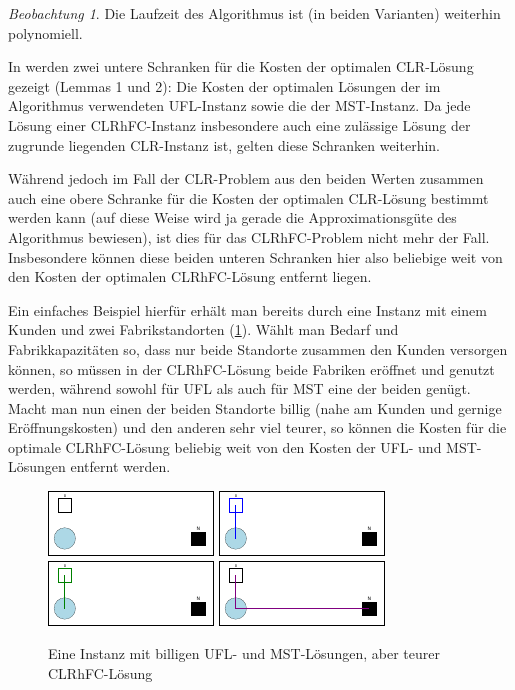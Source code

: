 \documentclass[a4paper,ngerman,11pt,bibtotoc]{scrartcl}
\theoremstyle{definition}
\theoremstyle{plain}
\theoremstyle{remark}
\newtheorem{beob}[defn]{Beobachtung}
\newcommand{\CLR}{CLR}
\newcommand{\CLRHFC}{CLRhFC}
\newcommand{\MST}{MST}
\newcommand{\UFL}{UFL}
\begin{document}
	\begin{beob}
		Die Laufzeit des Algorithmus ist (in beiden Varianten) weiterhin polynomiell. 
	\end{beob}
	
	In \cite{AAfCLR} werden zwei untere Schranken für die Kosten der optimalen \CLR-Lösung gezeigt (Lemmas 1 und 2): Die Kosten der optimalen Lösungen der im Algorithmus verwendeten \UFL-Instanz sowie die der \MST-Instanz. Da jede Lösung einer \CLRHFC-Instanz insbesondere auch eine zulässige Lösung der zugrunde liegenden \CLR-Instanz ist, gelten diese Schranken weiterhin.
	
	Während jedoch im Fall der \CLR-Problem aus den beiden Werten zusammen auch eine obere Schranke für die Kosten der optimalen \CLR-Lösung bestimmt werden kann (auf diese Weise wird ja gerade die Approximationsgüte des Algorithmus bewiesen), ist dies für das \CLRHFC-Problem nicht mehr der Fall. Insbesondere können diese beiden unteren Schranken hier also beliebige weit von den Kosten der optimalen \CLRHFC-Lösung entfernt liegen.
	
	Ein einfaches Beispiel hierfür erhält man bereits durch eine Instanz mit einem Kunden und zwei Fabrikstandorten (\cref{fig:bsp:schlechteUntereSchranken}). Wählt man Bedarf und Fabrikkapazitäten so, dass nur beide Standorte zusammen den Kunden versorgen können, so müssen in der \CLRHFC-Lösung beide Fabriken eröffnet und genutzt werden, während sowohl für \UFL{} als auch für \MST{} eine der beiden genügt. Macht man nun einen der beiden Standorte billig (nahe am Kunden und gernige Eröffnungskosten) und den anderen sehr viel teurer, so können die Kosten für die optimale \CLRHFC-Lösung beliebig weit von den Kosten der \UFL- und \MST-Lösungen entfernt werden.
	
	\begin{figure}[h]\centering
		\includegraphics[width=.24\textwidth]{bilder/beispiele/bsp1-instance.pdf}
		\includegraphics[width=.24\textwidth]{bilder/beispiele/bsp1-UFL.pdf}
		\includegraphics[width=.24\textwidth]{bilder/beispiele/bsp1-Tree.pdf}
		\includegraphics[width=.24\textwidth]{bilder/beispiele/bsp1-tours.pdf}
		\caption{Eine Instanz mit billigen \UFL- und \MST-Lösungen, aber teurer \CLRHFC-Lösung}\label{fig:bsp:schlechteUntereSchranken}
	\end{figure}
		
\end{document}
